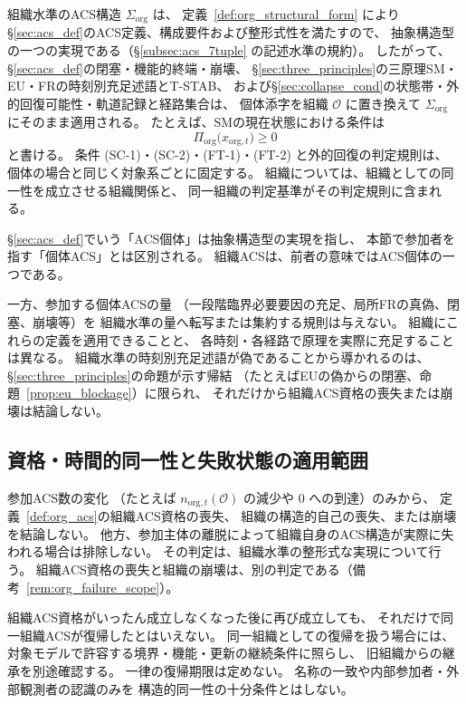 \begin{remark}[先行節の定義の組織水準への適用]
\label{rem:org_principles_conditional}
組織水準のACS構造 $\Sigma_{\mathrm{org}}$ は、
定義~\ref{def:org_structural_form} により
\S\ref{sec:acs_def}のACS定義、構成要件および整形式性を満たすので、
抽象構造型の一つの実現である（\S\ref{subsec:acs_7tuple} の記述水準の規約）。
したがって、
\S\ref{sec:acs_def}の閉塞・機能的終端・崩壊、
\S\ref{sec:three_principles}の三原理SM・EU・FRの時刻別充足述語とT-STAB、
および\S\ref{sec:collapse_cond}の状態帯・外的回復可能性・軌道記録と経路集合は、
個体添字を組織 $\mathcal O$ に置き換えて $\Sigma_{\mathrm{org}}$ にそのまま適用される。
たとえば、SMの現在状態における条件は
\begin{equation}
  \Pi_{\mathrm{org}}\bigl(x_{\mathrm{org},t}\bigr)\geq0
  \label{eq:org_SM}
\end{equation}
と書ける。
条件 (SC-1)・(SC-2)・(FT-1)・(FT-2) と外的回復の判定規則は、
個体の場合と同じく対象系ごとに固定する。
組織については、組織としての同一性を成立させる組織関係と、
同一組織の判定基準がその判定規則に含まれる。

\S\ref{sec:acs_def}でいう「ACS個体」は抽象構造型の実現を指し、
本節で参加者を指す「個体ACS」とは区別される。
組織ACSは、前者の意味ではACS個体の一つである。

一方、参加する個体ACSの量
（一段階臨界必要要因の充足、局所FRの真偽、閉塞、崩壊等）を
組織水準の量へ転写または集約する規則は与えない。
組織にこれらの定義を適用できることと、
各時刻・各経路で原理を実際に充足することは異なる。
組織水準の時刻別充足述語が偽であることから導かれるのは、
\S\ref{sec:three_principles}の命題が示す帰結
（たとえばEUの偽からの閉塞、命題~\ref{prop:eu_blockage}）に限られ、
それだけから組織ACS資格の喪失または崩壊は結論しない。
\end{remark}

\subsection{資格・時間的同一性と失敗状態の適用範囲}
\label{subsec:org_identity}

\begin{remark}[時刻別資格と組織の継続]
\label{rem:org_qualification_loss}
参加ACS数の変化
（たとえば $n_{\mathrm{org},t}(\mathcal O)$ の減少や $0$ への到達）のみから、
定義~\ref{def:org_acs}の組織ACS資格の喪失、
組織の構造的自己の喪失、または崩壊を結論しない。
他方、参加主体の離脱によって組織自身のACS構造が実際に失われる場合は排除しない。
その判定は、組織水準の整形式な実現について行う。
組織ACS資格の喪失と組織の崩壊は、別の判定である（備考~\ref{rem:org_failure_scope}）。

組織ACS資格がいったん成立しなくなった後に再び成立しても、
それだけで同一組織ACSが復帰したとはいえない。
同一組織としての復帰を扱う場合には、
対象モデルで許容する境界・機能・更新の継続条件に照らし、
旧組織からの継承を別途確認する。
一律の復帰期限は定めない。
名称の一致や内部参加者・外部観測者の認識のみを
構造的同一性の十分条件とはしない。
\end{remark}


